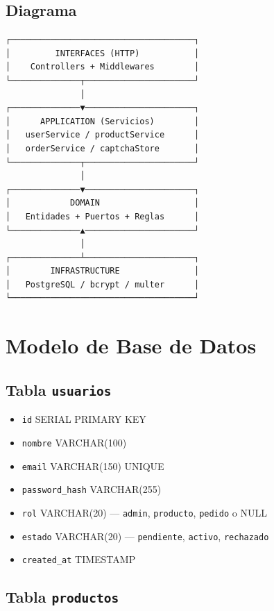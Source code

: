 \documentclass[11pt,letterpaper]{article}
\begin{document}
\subsection{Diagrama}

\begin{verbatim}
┌─────────────────────────────────────┐
│         INTERFACES (HTTP)           │
│    Controllers + Middlewares        │
└──────────────┬──────────────────────┘
               │
┌──────────────▼──────────────────────┐
│      APPLICATION (Servicios)        │
│   userService / productService      │
│   orderService / captchaStore       │
└──────────────┬──────────────────────┘
               │
┌──────────────▼──────────────────────┐
│            DOMAIN                   │
│   Entidades + Puertos + Reglas      │
└──────────────▲──────────────────────┘
               │
┌──────────────┴──────────────────────┐
│        INFRASTRUCTURE               │
│   PostgreSQL / bcrypt / multer      │
└─────────────────────────────────────┘
\end{verbatim}

\section{Modelo de Base de Datos}

\subsection{Tabla \texttt{usuarios}}

\begin{itemize}
  \item \texttt{id} SERIAL PRIMARY KEY
  \item \texttt{nombre} VARCHAR(100)
  \item \texttt{email} VARCHAR(150) UNIQUE
  \item \texttt{password\_hash} VARCHAR(255)
  \item \texttt{rol} VARCHAR(20) — \texttt{admin}, \texttt{producto}, \texttt{pedido} o NULL
  \item \texttt{estado} VARCHAR(20) — \texttt{pendiente}, \texttt{activo}, \texttt{rechazado}
  \item \texttt{created\_at} TIMESTAMP
\end{itemize}

\subsection{Tabla \texttt{productos}}
\end{document}

